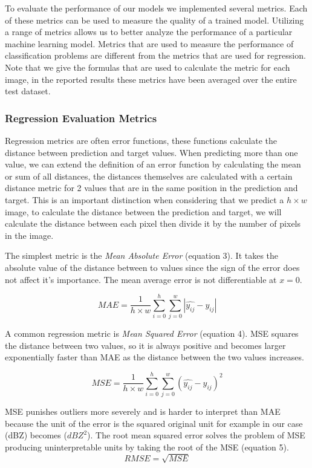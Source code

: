 To evaluate the performance of our models we implemented several metrics. Each of these metrics can be used to measure
the quality of a trained model. Utilizing a range of metrics allows us to better analyze the performance of a particular machine learning model.
Metrics that are used to measure the performance of classification problems are different from the metrics that are used for regression. Note that we
give the formulas that are used to calculate the metric for each image, in the reported results these metrics have been averaged over the entire test dataset.

\subsubsection{Regression Evaluation Metrics}
Regression metrics are often error functions, these functions calculate the distance between prediction and target values. 
When predicting more than one value, we can extend the definition of an error function
by calculating the mean or sum of all distances, the distances themselves are calculated with a certain distance metric for 2 values that are in the same position in the prediction and target.
This is an important distinction when considering that we predict a $h \times w$ image, to calculate the distance between the prediction and target, we will calculate the distance between each pixel then divide it by the number of pixels in the image.

The simplest metric is the \textit{Mean Absolute Error} (equation 3). It takes the absolute value
of the distance between to values since the sign of the error does not affect it's importance.
The mean average error is not differentiable at $x = 0$.

\begin{equation}
  MAE = \frac{1}{h \times w}\sum_{i=0}^h\sum_{j=0}^w |\hat{y_{ij}} -y_{ij}|
\end{equation}

A common regression metric is \textit{Mean Squared Error} (equation 4). MSE squares the distance between two values, so it is always positive and
becomes larger exponentially faster than MAE as the distance between the two values increases.

\begin{equation}
  MSE = \frac{1}{h\times w}\sum_{i=0}^h\sum_{j=0}^w (\hat{y_{ij}} -y_{ij})^2
\end{equation}

MSE punishes outliers more severely and is harder to interpret than MAE because the unit of the error is the squared original unit for example in our case (dBZ) becomes ($dBZ^2$).
The root mean squared error solves the problem of MSE producing uninterpretable units by taking the root of the MSE (equation 5).
\begin{equation}
RMSE = \sqrt{MSE}
\end{equation}

